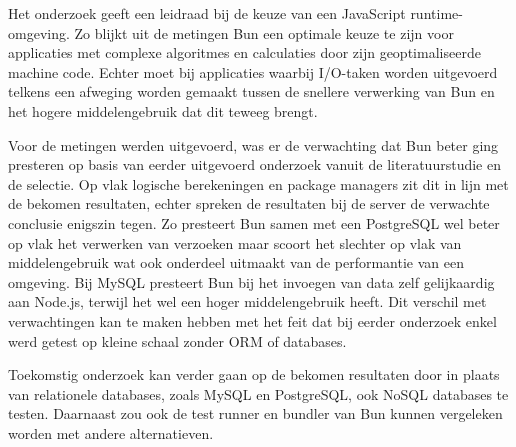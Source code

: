Het onderzoek geeft een leidraad bij de keuze van een JavaScript runtime-omgeving.
Zo blijkt uit de metingen Bun een optimale keuze te zijn voor applicaties met complexe algoritmes en calculaties door zijn geoptimaliseerde machine code.
Echter moet bij applicaties waarbij I/O-taken worden uitgevoerd telkens een afweging worden gemaakt tussen de snellere verwerking van Bun en het hogere middelengebruik dat dit teweeg brengt.


Voor de metingen werden uitgevoerd, was er de verwachting dat Bun beter ging presteren op basis van eerder uitgevoerd onderzoek vanuit de literatuurstudie en de selectie.
Op vlak logische berekeningen en package managers zit dit in lijn met de bekomen resultaten, echter spreken de resultaten bij de server de verwachte conclusie enigszin tegen.
Zo presteert Bun samen met een PostgreSQL wel beter op vlak het verwerken van verzoeken maar scoort het slechter op vlak van middelengebruik wat ook onderdeel uitmaakt van de performantie van een omgeving.
Bij MySQL presteert Bun bij het invoegen van data zelf gelijkaardig aan Node.js, terwijl het wel een hoger middelengebruik heeft.
Dit verschil met verwachtingen kan te maken hebben met het feit dat bij eerder onderzoek enkel werd getest op kleine schaal zonder ORM of databases.

Toekomstig onderzoek kan verder gaan op de bekomen resultaten door in plaats van relationele databases, zoals MySQL en PostgreSQL, ook NoSQL databases te testen.
Daarnaast zou ook de test runner en bundler van Bun kunnen vergeleken worden met andere alternatieven.

